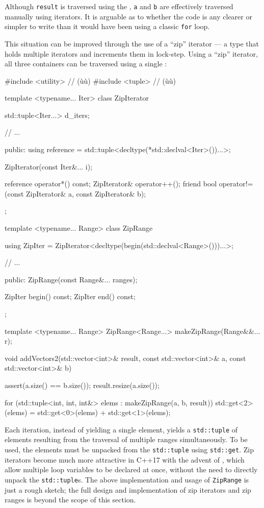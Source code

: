 {{{\noindent Although \lstinline!result! is traversed using the , \lstinline!a! and \lstinline!b! are effectively traversed
manually using iterators. It is arguable as to whether the code is any
clearer or simpler to write than it would have been using a classic
\lstinline!for! loop.

This situation can be improved through the use of a ``zip'' iterator ---
a type that holds multiple iterators and increments them in lock-step.
Using a ``zip'' iterator, all three containers can be traversed using a
single :

\begin{emcppslisting}
#include <utility>  // (ù{}ù)
#include <tuple>    // (ù{}ù)

template <typename... Iter>
class ZipIterator
{
    std::tuple<Iter...> d_iters;

    // ...

public:
    using reference = std::tuple<decltype(*std::declval<Iter>())...>;

    ZipIterator(const Iter&... i);

    reference operator*() const;
    ZipIterator& operator++();
    friend bool operator!=(const ZipIterator& a, const ZipIterator& b);
};

template <typename... Range>
class ZipRange
{
    using ZipIter =
        ZipIterator<decltype(begin(std::declval<Range>()))...>;

    // ...

public:
    ZipRange(const Range&... ranges);

    ZipIter begin() const;
    ZipIter end() const;
};

template <typename... Range>
ZipRange<Range...> makeZipRange(Range&&... r);

void addVectors2(std::vector<int>&       result,
                 const std::vector<int>& a,
                 const std::vector<int>& b)
{
    assert(a.size() == b.size());
    result.resize(a.size());

    for (std::tuple<int, int, int&> elems : makeZipRange(a, b, result))
    {
        std::get<2>(elems) = std::get<0>(elems) + std::get<1>(elems);
    }
}
\end{emcppslisting}
    
\noindent Each iteration, instead of yielding a single element, yields a
\lstinline!std::tuple! of elements resulting from the traversal of multiple
ranges simultaneously. To be used, the elements must be unpacked from
the \lstinline!std::tuple! using \lstinline!std::get!. Zip iterators become
much more attractive in C++17 with the advent of , which allow multiple loop variables to be declared at once,
without the need to directly unpack the \lstinline!std::tuple!s. The above
implementation and usage of \lstinline!ZipRange! is just a rough sketch;
the full design and implementation of zip iterators and zip ranges is
beyond the scope of this section.

}}}
